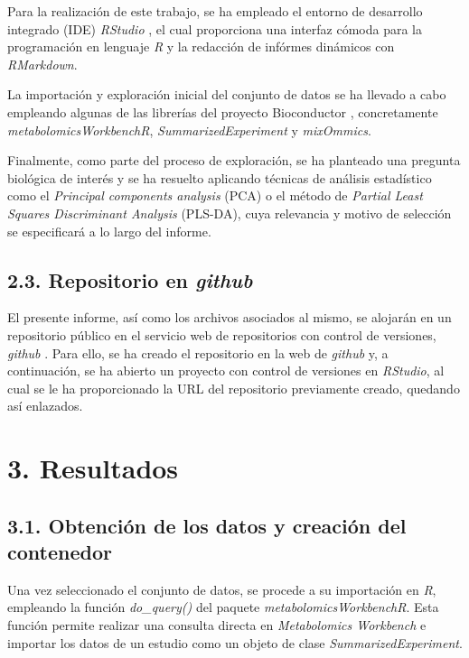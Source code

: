 \documentclass[
]{article}
\begin{document}
Para la realización de este trabajo, se ha empleado el entorno de
desarrollo integrado (IDE) \emph{RStudio} \citep{RStudio}, el cual
proporciona una interfaz cómoda para la programación en lenguaje
\emph{R} y la redacción de infórmes dinámicos con \emph{RMarkdown}.

La importación y exploración inicial del conjunto de datos se ha llevado
a cabo empleando algunas de las librerías del proyecto Bioconductor
\citep{Bioconductor}, concretamente \emph{metabolomicsWorkbenchR},
\emph{SummarizedExperiment} y \emph{mixOmmics}.

Finalmente, como parte del proceso de exploración, se ha planteado una
pregunta biológica de interés y se ha resuelto aplicando técnicas de
análisis estadístico como el \emph{Principal components analysis} (PCA)
o el método de \emph{Partial Least Squares Discriminant Analysis}
(PLS-DA), cuya relevancia y motivo de selección se especificará a lo
largo del informe.

\subsection{\texorpdfstring{2.3. Repositorio en
\emph{github}}{2.3. Repositorio en github}}\label{repositorio-en-github}

El presente informe, así como los archivos asociados al mismo, se
alojarán en un repositorio público en el servicio web de repositorios
con control de versiones, \emph{github} \citep{github}. Para ello, se ha
creado el repositorio en la web de \emph{github} y, a continuación, se
ha abierto un proyecto con control de versiones en \emph{RStudio}, al
cual se le ha proporcionado la URL del repositorio previamente creado,
quedando así enlazados.

\section{3. Resultados}\label{resultados}

\subsection{3.1. Obtención de los datos y creación del
contenedor}\label{obtenciuxf3n-de-los-datos-y-creaciuxf3n-del-contenedor}

Una vez seleccionado el conjunto de datos, se procede a su importación
en \emph{R}, empleando la función \emph{do\_query()} del paquete
\emph{metabolomicsWorkbenchR}. Esta función permite realizar una
consulta directa en \emph{Metabolomics Workbench} e importar los datos
de un estudio como un objeto de clase \emph{SummarizedExperiment}.
\end{document}
